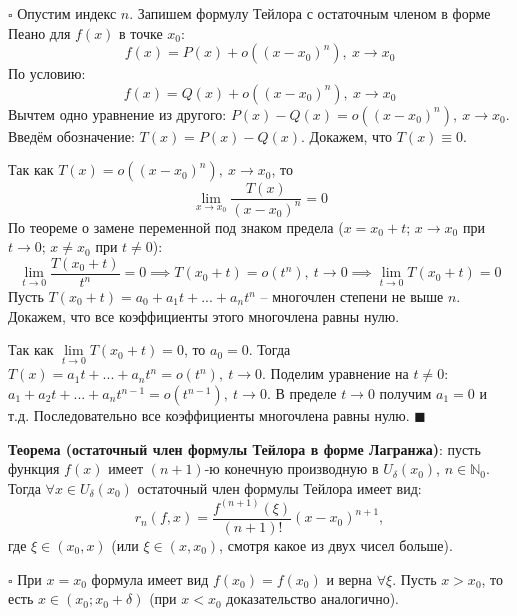 \documentclass[12pt, a4paper, reqno]{article}
\begin{document}
    $\square$ Опустим индекс $n$. Запишем формулу Тейлора с остаточным членом в форме Пеано для
    $f(x)$ в точке $x_0$:
    \begin{equation*}
        f(x) = P(x) + o((x - x_0)^n),\ x\to x_0
    \end{equation*}
    По условию:
    \begin{equation*}
        f(x) = Q(x) + o((x - x_0)^n),\ x\to x_0
    \end{equation*}
    Вычтем одно уравнение из другого: $P(x) - Q(x) = o((x - x_0)^n),\ x\to x_0$. Введём обозначение:
    $T(x) = P(x) - Q(x)$. Докажем, что $T(x) \equiv 0$.

    Так как $T(x) = o((x - x_0)^n),\ x\to x_0$, то
    \begin{equation*}
        \lim\limits_{x\to x_0}\dfrac{T(x)}{(x - x_0)^n} = 0
    \end{equation*}
    По теореме о замене переменной под знаком предела ($x = x_0 + t$; $x\to x_0$ при $t\to 0$;
    $x\neq x_0$ при $t\neq 0$):
    \begin{equation*}
        \lim\limits_{t\to 0}\dfrac{T(x_0 + t)}{t^n} = 0 \implies T(x_0 + t) = o(t^n),\ t \to 0
        \implies \lim\limits_{t\to 0} T(x_0 + t) = 0
    \end{equation*}
    Пусть $T(x_0 + t) = a_0 + a_1t + ... + a_nt^n$ -- многочлен степени не выше $n$. Докажем, что все
    коэффициенты этого многочлена равны нулю.

    Так как $\lim\limits_{t\to 0} T(x_0 + t) = 0$, то $a_0 = 0$. Тогда $T(x) = a_1t + ... + a_nt^n =
    o(t^n),\ t \to 0$. Поделим уравнение на $t\neq 0$: $a_1 + a_2t + ... + a_nt^{n - 1} =
    o(t^{n - 1}),\ t \to 0$. В пределе $t\to 0$ получим $a_1 = 0$ и т.д. Последовательно все
    коэффициенты многочлена равны нулю. $\blacksquare$

    \textbf{Теорема (остаточный член формулы Тейлора в форме Лагранжа)}: пусть функция $f(x)$ имеет
    $(n + 1)$-ю конечную производную в $U_{\delta}(x_0)$, $n\in\mathbb{N}_0$. Тогда
    $\forall x\in U_{\delta}(x_0)$ остаточный член формулы Тейлора имеет вид:
    \begin{equation*}
        r_n(f, x) = \dfrac{f^{(n + 1)}(\xi)}{(n + 1)!}(x - x_0)^{n + 1},
    \end{equation*}
    где $\xi\in(x_0, x)$ (или $\xi\in(x, x_0)$, смотря какое из двух чисел больше).

    $\square$ При $x = x_0$ формула имеет вид $f(x_0) = f(x_0)$ и верна $\forall\xi$. Пусть
    $x > x_0$, то есть $x\in(x_0; x_0 + \delta)$ (при $x < x_0$ доказательство аналогично).
\end{document}
